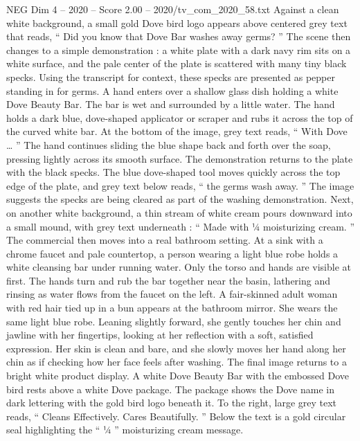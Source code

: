 \begin{textsample}{NEG Dim 4 – 2020 – Score 2.00 – 2020/tv\_com\_2020\_58.txt}  \label{ex:f4_neg_090}
Against a clean white background, a small gold Dove bird logo appears above centered grey text that reads, “ Did you know that Dove Bar washes away germs? ” The scene then changes to a simple demonstration : a white plate with a dark navy rim sits on a white surface, and the pale center of the plate is scattered with many tiny black specks.
Using the transcript for context, these specks are presented as pepper standing in for germs.
A hand enters over a shallow glass dish holding a white Dove Beauty Bar.
The bar is wet and surrounded by a little water.
The hand holds a dark blue, dove-shaped applicator or scraper and rubs it across the top of the curved white bar.
At the bottom of the image, grey text reads, “ With Dove … ” The hand continues sliding the blue shape back and forth over the soap, pressing lightly across its smooth surface.
The demonstration returns to the plate with the black specks.
The blue dove-shaped tool moves quickly across the top edge of the plate, and grey text below reads, “ the germs wash away. ” The image suggests the specks are being cleared as part of the washing demonstration.
Next, on another white background, a thin stream of white cream pours downward into a small mound, with grey text underneath : “ Made with ¼ moisturizing cream. ” The commercial then moves into a real bathroom setting.
At a sink with a chrome faucet and pale countertop, a person wearing a light blue robe holds a white cleansing bar under running water.
Only the torso and hands are visible at first.
The hands turn and rub the bar together near the basin, lathering and rinsing as water flows from the faucet on the left.
A fair-skinned adult woman with red hair tied up in a bun appears at the bathroom mirror.
She wears the same light blue robe.
Leaning slightly forward, she gently touches her chin and jawline with her fingertips, looking at her reflection with a soft, satisfied expression.
Her skin is clean and bare, and she slowly moves her hand along her chin as if checking how her face feels after washing.
The final image returns to a bright white product display.
A white Dove Beauty Bar with the embossed Dove bird rests above a white Dove package.
The package shows the Dove name in dark lettering with the gold bird logo beneath it.
To the right, large grey text reads, “ Cleans Effectively.
Cares Beautifully. ” Below the text is a gold circular seal highlighting the “ ¼ ” moisturizing cream message.

\end{textsample}

